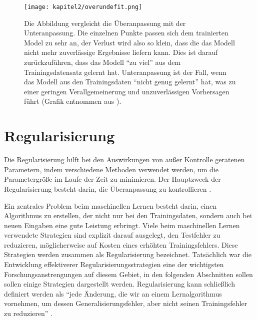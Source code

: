    \begin{figure}[H]
      \centering
      \texttt{[image: kapitel2/overundefit.png]}
      \caption[Vergleich der Unteranpassung mit der Überanpassung]{Die Abbildung vergleicht die Überanpassung mit der Unteranpassung. Die einzelnen Punkte passen sich dem trainierten Model zu sehr an, der Verlust wird also so klein, dass die das Modell nicht mehr zuverlässige Ergebnisse liefern kann. Dies ist darauf zurückzuführen, dass das Modell \enquote{zu viel} aus dem Trainingsdatensatz gelernt hat. Unteranpassung ist der Fall, wenn das Modell aus den Trainingsdaten \enquote{nicht genug gelernt} hat, was zu einer geringen Verallgemeinerung und unzuverlässigen Vorhersagen führt (Grafik entnommen aus \cite*[27]{Patterson2019}). }
      \label{Kap2:OverUnder}
    \end{figure}

    \section{Regularisierung}
    Die Regularisierung hilft bei den Auswirkungen von außer Kontrolle geratenen Parametern, indem verschiedene Methoden verwendet werden, um die Parametergröße im Laufe der Zeit zu minimieren. Der Hauptzweck der Regularisierung besteht darin, die Überanpassung zu kontrollieren \cite*[79]{Patterson2019}.

    Ein zentrales Problem beim maschinellen Lernen besteht darin, einen Algorithmus zu erstellen, der nicht nur bei den Trainingsdaten, sondern auch bei neuen Eingaben eine gute Leistung erbringt. Viele beim maschinellen Lernen verwendete Strategien sind explizit darauf ausgelegt, den Testfehler zu reduzieren, möglicherweise auf Kosten eines erhöhten Trainingsfehlers. Diese Strategien werden zusammen als Regularisierung bezeichnet. Tatsächlich war die Entwicklung effektiverer Regularisierungsstrategien eine der wichtigsten Forschungsanstrengungen auf diesem Gebiet, in den folgenden Abschnitten sollen sollen einige Strategien dargestellt werden. Regularisierung kann schließlich definiert werden als \enquote{jede Änderung, die wir an einem Lernalgorithmus vornehmen, um dessen Generalisierungsfehler, aber nicht seinen Trainingsfehler zu reduzieren} \cite*[228]{IanGoodfellowYoshuaBengio2016}.

